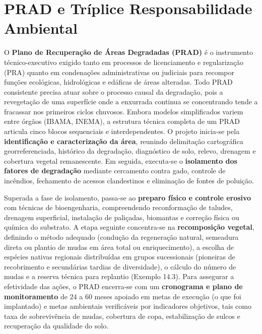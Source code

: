 \section{PRAD e Tríplice Responsabilidade Ambiental}

O \textbf{Plano de Recuperação de Áreas Degradadas (PRAD)} é o instrumento técnico-executivo exigido tanto em processos de licenciamento e regularização (PRA) quanto em condenações administrativas ou judiciais para recompor funções ecológicas, hidrológicas e edáficas de áreas alteradas. Todo PRAD consistente precisa atuar sobre o processo causal da degradação, pois a revegetação de uma superfície onde a enxurrada continua se concentrando tende a fracassar nos primeiros ciclos chuvosos. Embora modelos simplificados variem entre órgãos (IBAMA, INEMA), a estrutura técnica completa de um PRAD articula cinco blocos sequenciais e interdependentes. O projeto inicia-se pela \textbf{identificação e caracterização da área}, reunindo delimitação cartográfica georreferenciada, histórico da degradação, diagnóstico de solo, relevo, drenagem e cobertura vegetal remanescente. Em seguida, executa-se o \textbf{isolamento dos fatores de degradação} mediante cercamento contra gado, controle de incêndios, fechamento de acessos clandestinos e eliminação de fontes de poluição.

Superada a fase de isolamento, passa-se ao \textbf{preparo físico e controle erosivo} com técnicas de bioengenharia, compreendendo reconformação de taludes, drenagem superficial, instalação de paliçadas, biomantas e correção física ou química do substrato. A etapa seguinte concentra-se na \textbf{recomposição vegetal}, definindo o método adequado (condução da regeneração natural, semeadura direta ou plantio de mudas em área total ou enriquecimento), a escolha de espécies nativas regionais distribuídas em grupos sucessionais (pioneiras de recobrimento e secundárias tardias de diversidade), o cálculo do número de mudas e a reserva técnica para replantio (Exemplo 14.3). Para assegurar a efetividade das ações, o PRAD encerra-se com um \textbf{cronograma e plano de monitoramento} de $24$ a $60$ meses apoiado em metas de execução (o que foi implantado) e metas ambientais verificáveis por indicadores objetivos, tais como taxa de sobrevivência de mudas, cobertura de copa, estabilização de sulcos e recuperação da qualidade do solo.

